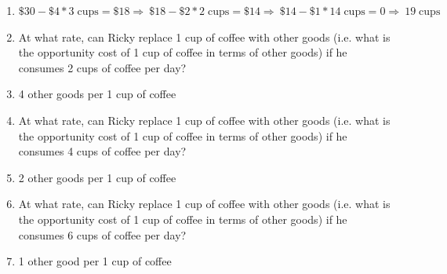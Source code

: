\documentclass{article}
\begin{document}
\begin{enumerate}
\begin{enumerate}[label=(\alph*)]
\item[] $\$30-\$4*3\;\text{cups}=\$18 \Rightarrow\ \$18-\$2*2\;\text{cups}=\$14 \Rightarrow\ \$14-\$1*14\;\text{cups}=0 \Rightarrow\ 19\; \text{cups}$
\item At what rate, can Ricky replace 1 cup of coffee with other goods (i.e. what is the opportunity cost of 1 cup of coffee in terms of other goods) if he consumes 2 cups of coffee per day?
\item[] 4 other goods per 1 cup of coffee
\item At what rate, can Ricky replace 1 cup of coffee with other goods (i.e. what is the opportunity cost of 1 cup of coffee in terms of other goods)  if he consumes 4 cups of coffee per day?
\item[] 2 other goods per 1 cup of coffee
\item At what rate, can Ricky replace 1 cup of coffee with other goods (i.e. what is the opportunity cost of 1 cup of coffee in terms of other goods)  if he consumes 6 cups of coffee per day?
\item[] 1 other good per 1 cup of coffee
\end{enumerate}
\end{enumerate}
\end{document}
